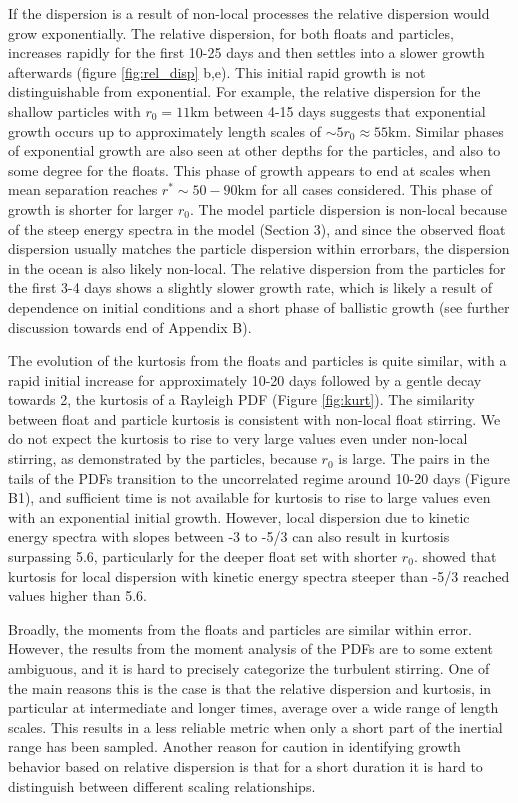\documentclass[]{ametsoc}
\begin{document}
If the dispersion is a result of non-local processes the relative dispersion would grow exponentially. The relative dispersion, for both floats and particles, increases rapidly for the first 10-25 days and then settles into a slower growth afterwards (figure \ref{fig:rel_disp} b,e). This initial rapid growth is not distinguishable from exponential. For example, the relative dispersion for the shallow particles with $r_0=11$km between 4-15 days suggests that exponential growth occurs up to approximately length scales of  $\sim 5r_0 \approx 55$km. Similar phases of exponential growth are also seen at other depths for the particles, and also to some degree for the floats. This phase of growth appears to end at scales when mean separation reaches $r^*\sim 50-90$km for all cases considered. This phase of growth is shorter for larger $r_0$. The model particle dispersion is non-local because of the steep energy spectra in the model (Section 3), and since the observed float dispersion usually matches the particle dispersion within errorbars, the dispersion in the ocean is also likely non-local. The relative dispersion from the particles for the first 3-4 days shows a slightly slower growth rate, which is likely a result of dependence on initial conditions and a short phase of ballistic growth (see further discussion towards end of Appendix B).

The evolution of the kurtosis from the floats and particles is quite similar, with a rapid initial increase for approximately 10-20 days followed by a gentle decay towards 2, the kurtosis of a Rayleigh PDF (Figure \ref{fig:kurt}). The similarity between float and particle kurtosis is consistent with non-local float stirring. We do not expect the kurtosis to rise to very large values even under non-local stirring, as demonstrated by the particles, because $r_0$ is large. The pairs in the tails of the PDFs transition to the uncorrelated regime around 10-20 days (Figure B1), and sufficient time is not available for kurtosis to rise to large values even with an exponential initial growth. However, local dispersion due to kinetic energy spectra with slopes between -3 to -5/3 can also result in kurtosis surpassing 5.6, particularly for the deeper float set with shorter $r_0$. \citet{foussard2017relative} showed that kurtosis for local dispersion with kinetic energy spectra steeper than -5/3 reached values higher than 5.6.

Broadly, the moments from the floats and particles are similar within error. However, the results from the moment analysis of the PDFs are to some extent ambiguous, and it is hard to precisely categorize the turbulent stirring. One of the main reasons this is the case is that the relative dispersion and kurtosis, in particular at intermediate and longer times, average over a wide range of length scales. This results in a less reliable metric when only a short part of the inertial range has been sampled. Another reason for caution in identifying growth behavior based on relative dispersion is that for a short duration it is hard to distinguish between different scaling relationships. 
\end{document}
